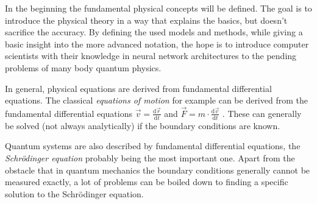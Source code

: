 In the beginning the fundamental physical concepts will be defined. 
The goal is to introduce the physical theory in a way that explains the basics, but doesn't sacrifice the accuracy. 
By defining the used models and methods, while giving a basic insight into the more advanced notation, the hope is to introduce computer scientists with their knowledge in neural network architectures to the pending problems of many body quantum physics.

In general, physical equations are derived from fundamental differential equations. 
The classical \emph{equations of motion} for example can be derived from the fundamental differential equations $\vec{v} = \frac{\mathrm{d}\vec{r}}{\mathrm{d}t}$ and $\vec{F} = m \cdot \frac{\mathrm{d}\vec{v}}{\mathrm{d}t}$ \cite{demtroderExperimentalphysik}.
These can generally be solved (not always analytically) if the boundary conditions are known.

Quantum systems are also described by fundamental differential equations, the \emph{Schrödinger equation} probably being the most important one. Apart from the obstacle that in quantum mechanics the boundary conditions generally cannot be measured exactly, a lot of problems can be boiled down to finding a specific solution to the Schrödinger equation.